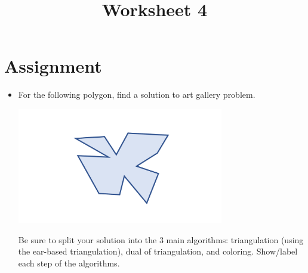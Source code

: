 \documentclass[a4paper,12pt]{article}
\title{Worksheet 4}
\begin{document}
\maketitle

\worksheetGroundRules


\vspace{5pt}
\section{Assignment}

\begin{itemize}


\item For the following polygon, find a solution to art gallery problem. 

\begin{center}
\includegraphics[width=9cm]{../images/worksheet3.pdf}
\end{center}

Be sure to split your solution into the 3 main algorithms: triangulation (using the ear-based triangulation), dual of triangulation, and coloring. Show/label each step of the algorithms. 

\end{itemize}


\worksheetSubmission
\end{document}
